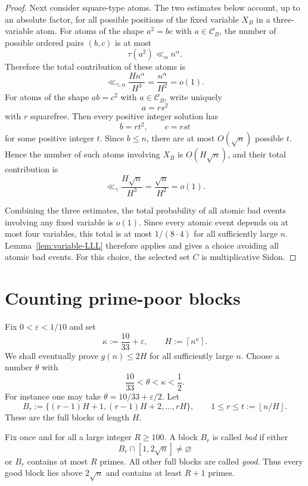 \documentclass[11pt,reqno]{amsart}
\numberwithin{equation}{section}
\theoremstyle{plain}
\theoremstyle{definition}
\newcommand{\eps}{\varepsilon}
\newcommand{\floor}[1]{\left\lfloor #1\right\rfloor}
\newcommand{\ceil}[1]{\left\lceil #1\right\rceil}
\begin{document}
\begin{proof}
Next consider square-type atoms. The two estimates below account, up to an absolute factor, for all possible
positions of the fixed variable \(X_B\) in a three-variable atom. For atoms of the shape \(a^2=bc\) with
\(a\in\mathcal C_B\), the number of possible ordered pairs \((b,c)\) is at most
\[
        \tau(a^2)\ll_\alpha n^\alpha.
\]
Therefore the total contribution of these atoms is
\[
        \ll_{\gamma,\alpha} \frac{H n^\alpha}{H^3}
        =
        \frac{n^\alpha}{H^2}
        =
        o(1).
\]
For atoms of the shape \(ab=c^2\) with \(a\in\mathcal C_B\), write uniquely
\[
        a=rs^2
\]
with \(r\) squarefree.  Then every positive integer solution has
\[
        b=rt^2,
        \qquad c=rst
\]
for some positive integer \(t\).  Since \(b\le n\), there are at most
\(O(\sqrt n)\) possible \(t\).  Hence the number of such atoms involving
\(X_B\) is \(O(H\sqrt n)\), and their total contribution is
\[
        \ll_\gamma \frac{H\sqrt n}{H^3}
        =
        \frac{\sqrt n}{H^2}
        =
        o(1).
\]

Combining the three estimates, the total probability of all atomic bad events
involving any fixed variable is \(o(1)\).  Since every atomic event depends on
at most four variables, this total is at most \(1/(8\cdot 4)\) for all
sufficiently large \(n\).  Lemma~\ref{lem:variable-LLL} therefore applies and
gives a choice avoiding all atomic bad events.  For this choice, the selected
set \(C\) is multiplicative Sidon.
\end{proof}

\section{Counting prime-poor blocks}

Fix \(0<\eps<1/10\) and set
\[
        \kappa:=\frac{10}{33}+\eps,
        \qquad H:=\ceil{n^\kappa}.
\]
We shall eventually prove $g(n)\le 2H$ for all sufficiently large $n$.
Choose a number $\theta$ with
\[
        \frac{10}{33}<\theta<\kappa<\frac12.
\]
For instance one may take $\theta=10/33+\eps/2$.
Let
\[
        B_r:=\{(r-1)H+1,(r-1)H+2,\ldots,rH\},
        \qquad 1\le r\le t:=\floor{n/H}.
\]
These are the full blocks of length $H$.

Fix once and for all a large integer $R\ge100$.
A block $B_r$ is called \emph{bad} if either
\[
        B_r\cap [1,2\sqrt n]\ne\varnothing
\]
or $B_r$ contains at most $R$ primes.  All other full blocks are called
\emph{good}.  Thus every good block lies above $2\sqrt n$ and contains at least
$R+1$ primes.
\end{document}
